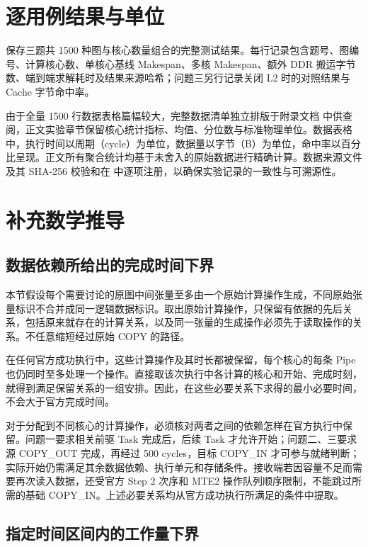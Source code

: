 \documentclass[anonymous,notoc]{gmcm2026}
\begin{document}
\appendix
\section{逐用例结果与单位}

\texttt{} 保存三题共 1500 种图与核心数量组合的完整测试结果。每行记录包含题号、图编号、计算核心数、单核心基线 Makespan、多核 Makespan、额外 DDR 搬运字节数、端到端求解耗时及结果来源哈希；问题三另行记录关闭 L2 时的对照结果与 Cache 字节命中率。

由于全量 1500 行数据表格篇幅较大，完整数据清单独立排版于附录文档 \texttt{} 中供查阅，正文实验章节保留核心统计指标、均值、分位数与标准物理单位。数据表格中，执行时间以周期（cycle）为单位，数据量以字节（B）为单位，命中率以百分比呈现。正文所有聚合统计均基于未舍入的原始数据进行精确计算。数据来源文件及其 SHA-256 校验和在 \texttt{} 中逐项注册，以确保实验记录的一致性与可溯源性。

\section{补充数学推导}

\subsection{数据依赖所给出的完成时间下界}

本节假设每个需要讨论的原图中间张量至多由一个原始计算操作生成，不同原始张量标识不合并成同一逻辑数据标识。取出原始计算操作，只保留有依据的先后关系，包括原来就存在的计算关系，以及同一张量的生成操作必须先于读取操作的关系。不任意缩短经过原始 COPY 的路径。

在任何官方成功执行中，这些计算操作及其时长都被保留，每个核心的每条 Pipe 也仍同时至多处理一个操作。直接取该次执行中各计算的核心和开始、完成时刻，就得到满足保留关系的一组安排。因此，在这些必要关系下求得的最小必要时间，不会大于官方完成时间。

对于分配到不同核心的计算操作，必须核对两者之间的依赖怎样在官方执行中保留。问题一要求相关前驱 Task 完成后，后续 Task 才允许开始；问题二、三要求源 COPY\_OUT 完成，再经过 500 cycles，目标 COPY\_IN 才可参与就绪判断；实际开始仍需满足其余数据依赖、执行单元和存储条件。接收端若因容量不足而需要再次读入数据，还受官方 Step 2 次序和 MTE2 操作队列顺序限制，不能跳过所需的基础 COPY\_IN。上述必要关系均从官方成功执行所满足的条件中提取。

\subsection{指定时间区间内的工作量下界}
\end{document}
